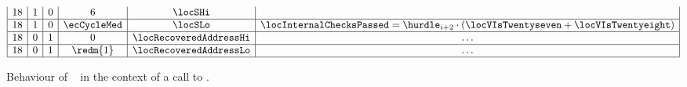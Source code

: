 \begin{figure}[h!]
\[\begin{array}{|c|c|c|c|c|c|c|}
            18                        & 1                                      & 0                                        & 6                      & \locSHi                &                                                                                          \\ \hline
            18                        & 1                                      & 0                                        & \ecCycleMed            & \locSLo                & \locInternalChecksPassed = \hurdle_{i+2} \cdot (\locVIsTwentyseven + \locVIsTwentyeight) \\ \hline
            18                        & 0                                      & 1                                        & 0                      & \locRecoveredAddressHi & \hdots                                                                                   \\ \hline
            18                        & 0                                      & 1                                        & \redm{1}               & \locRecoveredAddressLo & \hdots                                                                                   \\ \hline
        \end{array}
    \]
    \caption{Behaviour of \hurdle ~ in the context of a call to .}
\end{figure}


